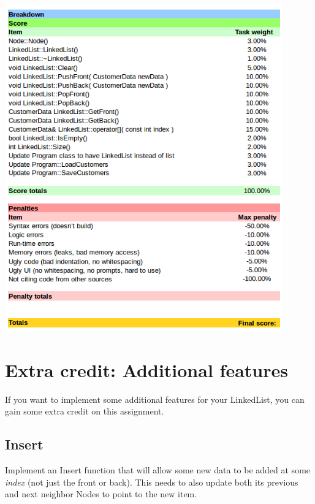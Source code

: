 \documentclass[a4paper,12pt,oneside]{book}
\begin{document}
    \begin{center}
        \includegraphics[width=12cm]{images/gradesheet-project1.png}
    \end{center}
    
    \chapter{Extra credit: Additional features}
    
    If you want to implement some additional features for your LinkedList,
    you can gain some extra credit on this assignment.
    
    \section{Insert}
    
        Implement an Insert function that will allow some new data
        to be added at some \textit{index} (not just the front or back).
        This needs to also update both its previous and next neighbor
        Nodes to point to the new item.
    
\end{document}
